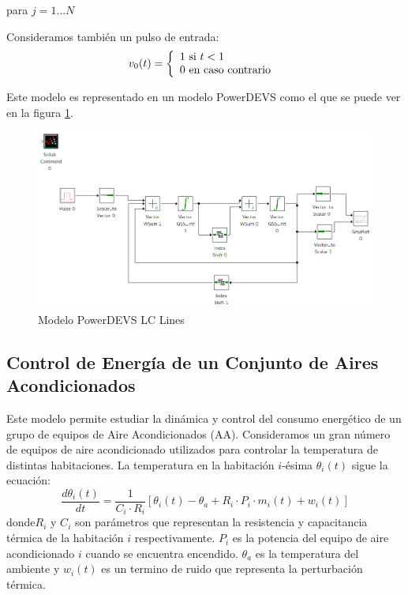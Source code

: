 \documentclass[a4paper,	11pt]{report}
\begin{document}
para $j = 1 \dots N$

Consideramos también un pulso de entrada:
\begin{equation}
v_0(t) = \left\{ 
  \begin{array}{l l}
    1 \text{ si } t < 1 \\
    0 \text{ en caso contrario }
  \end{array} \right.
\end{equation}

Este modelo es representado en un modelo PowerDEVS como el que se puede ver en la figura \ref{fig:lclines}.

\begin{figure}[!htbp]
  \includegraphics[scale=0.40]{lclines}
  \caption{Modelo PowerDEVS LC Lines }
   \label{fig:lclines}
\end{figure}

\subsection{Control de Energía de un Conjunto de Aires Acondicionados}
Este modelo permite estudiar la dinámica y control del consumo energético de un grupo de equipos de Aire Acondicionados (AA). Consideramos un gran número de equipos de aire acondicionado utilizados para controlar la temperatura de distintas habitaciones. La temperatura en la habitación $i$-ésima $\theta_i(t)$ sigue la ecuación:
\begin{equation*}
\frac{d\theta_i(t)}{dt} = \frac{1}{C_i \cdot R_i } [ \theta_i(t) - \theta_a + R_i \cdot P_i \cdot m_i(t) + w_i(t) ]
\end{equation*}
donde$R_i$ y $C_i$ son parámetros que representan la resistencia y capacitancia térmica de la habitación $i$ respectivamente. $P_i$ es la potencia del equipo de aire acondicionado $i$ cuando se encuentra encendido. $\theta_a$ es la temperatura del ambiente y $w_i(t)$ es un termino de ruido que representa la perturbación térmica.
\end{document}
